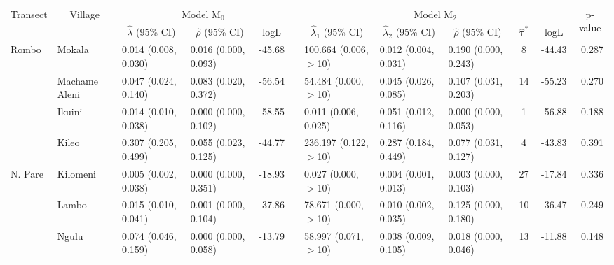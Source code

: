 \begin{tabular}{lllllllllclr}
\toprule
\multicolumn{1}{c}{\multirow{2}{*}{Transect}} & \multicolumn{1}{c}{\multirow{2}{*}{Village}} & \multicolumn{3}{c}{Model M$_0$} & \multicolumn{1}{c}{} & \multicolumn{5}{c}{Model M$_2$} & \multicolumn{1}{c}{\multirow{2}{*}{p-value}}  \\ 
\cmidrule{3-5}\cmidrule{7-11}
\multicolumn{1}{c}{} & \multicolumn{1}{c}{} & \multicolumn{1}{c}{$\hat{\lambda}$ (95\% CI)} & \multicolumn{1}{c}{$\hat{\rho}$ (95\% CI)} & \multicolumn{1}{c}{logL} & \multicolumn{1}{c}{} & \multicolumn{1}{c}{$\hat{\lambda}_1$ (95\% CI)} & \multicolumn{1}{c}{$\hat{\lambda}_2$ (95\% CI)} & \multicolumn{1}{c}{$\hat{\rho}$ (95\% CI)} & \multicolumn{1}{c}{$\hat{\uptau}^*$} & \multicolumn{1}{c}{logL} & \multicolumn{1}{c}{} \\ 
\midrule
Rombo       & Mokala         & 0.014 (0.008, 0.030)   & 0.016 (0.000, 0.093)   & -45.68   & &   100.664 (0.006, $>$10) & 0.012 (0.004, 0.031)   & 0.190 (0.000, 0.243)   & 8   & -44.43   & 0.287\\
            & Machame Aleni  & 0.047 (0.024, 0.140)   & 0.083 (0.020, 0.372)   & -56.54   & &   54.484 (0.000, $>$10)  & 0.045 (0.026, 0.085)   & 0.107 (0.031, 0.203)   & 14  & -55.23   & 0.270\\
            & Ikuini         & 0.014 (0.010, 0.038)   & 0.000 (0.000, 0.102)   & -58.55   & &   0.011 (0.006, 0.025)   & 0.051 (0.012, 0.116)   & 0.000 (0.000, 0.053)   & 1   & -56.88   & 0.188\\
            & Kileo          & 0.307 (0.205, 0.499)   & 0.055 (0.023, 0.125)   & -44.77   & &   236.197 (0.122, $>$10) & 0.287 (0.184, 0.449)   & 0.077 (0.031, 0.127)   & 4   & -43.83   & 0.391\\
\cmidrule{2-12}
N. Pare     & Kilomeni       & 0.005 (0.002, 0.038)   & 0.000 (0.000, 0.351)   & -18.93   & &   0.027 (0.000, $>$10)   & 0.004 (0.001, 0.013)   & 0.003 (0.000, 0.103)   & 27  & -17.84   & 0.336\\
            & Lambo          & 0.015 (0.010, 0.041)   & 0.001 (0.000, 0.104)   & -37.86   & &   78.671 (0.000, $>$10)  & 0.010 (0.002, 0.035)   & 0.125 (0.000, 0.180)   & 10  & -36.47   & 0.249\\
            & Ngulu          & 0.074 (0.046, 0.159)   & 0.000 (0.000, 0.058)   & -13.79   & &   58.997 (0.071, $>$10)  & 0.038 (0.009, 0.105)   & 0.018 (0.000, 0.046)   & 13  & -11.88   & 0.148\\

\end{tabular}
